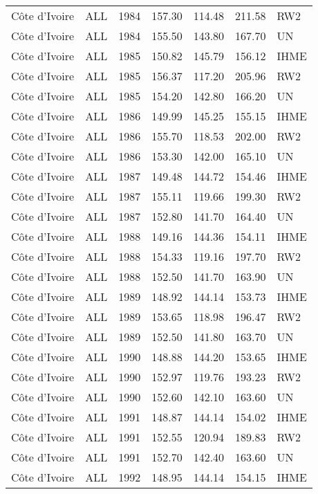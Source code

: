 \begin{longtable}{lllrrrl}
  C\^{o}te d'Ivoire & ALL & 1984 & 157.30 & 114.48 & 211.58 & RW2 \\ 
  C\^{o}te d'Ivoire & ALL & 1984 & 155.50 & 143.80 & 167.70 & UN \\ 
  C\^{o}te d'Ivoire & ALL & 1985 & 150.82 & 145.79 & 156.12 & IHME \\ 
  C\^{o}te d'Ivoire & ALL & 1985 & 156.37 & 117.20 & 205.96 & RW2 \\ 
  C\^{o}te d'Ivoire & ALL & 1985 & 154.20 & 142.80 & 166.20 & UN \\ 
  C\^{o}te d'Ivoire & ALL & 1986 & 149.99 & 145.25 & 155.15 & IHME \\ 
  C\^{o}te d'Ivoire & ALL & 1986 & 155.70 & 118.53 & 202.00 & RW2 \\ 
  C\^{o}te d'Ivoire & ALL & 1986 & 153.30 & 142.00 & 165.10 & UN \\ 
  C\^{o}te d'Ivoire & ALL & 1987 & 149.48 & 144.72 & 154.46 & IHME \\ 
  C\^{o}te d'Ivoire & ALL & 1987 & 155.11 & 119.66 & 199.30 & RW2 \\ 
  C\^{o}te d'Ivoire & ALL & 1987 & 152.80 & 141.70 & 164.40 & UN \\ 
  C\^{o}te d'Ivoire & ALL & 1988 & 149.16 & 144.36 & 154.11 & IHME \\ 
  C\^{o}te d'Ivoire & ALL & 1988 & 154.33 & 119.16 & 197.70 & RW2 \\ 
  C\^{o}te d'Ivoire & ALL & 1988 & 152.50 & 141.70 & 163.90 & UN \\ 
  C\^{o}te d'Ivoire & ALL & 1989 & 148.92 & 144.14 & 153.73 & IHME \\ 
  C\^{o}te d'Ivoire & ALL & 1989 & 153.65 & 118.98 & 196.47 & RW2 \\ 
  C\^{o}te d'Ivoire & ALL & 1989 & 152.50 & 141.80 & 163.70 & UN \\ 
  C\^{o}te d'Ivoire & ALL & 1990 & 148.88 & 144.20 & 153.65 & IHME \\ 
  C\^{o}te d'Ivoire & ALL & 1990 & 152.97 & 119.76 & 193.23 & RW2 \\ 
  C\^{o}te d'Ivoire & ALL & 1990 & 152.60 & 142.10 & 163.60 & UN \\ 
  C\^{o}te d'Ivoire & ALL & 1991 & 148.87 & 144.14 & 154.02 & IHME \\ 
  C\^{o}te d'Ivoire & ALL & 1991 & 152.55 & 120.94 & 189.83 & RW2 \\ 
  C\^{o}te d'Ivoire & ALL & 1991 & 152.70 & 142.40 & 163.60 & UN \\ 
  C\^{o}te d'Ivoire & ALL & 1992 & 148.95 & 144.14 & 154.15 & IHME \\ 

\end{longtable}
